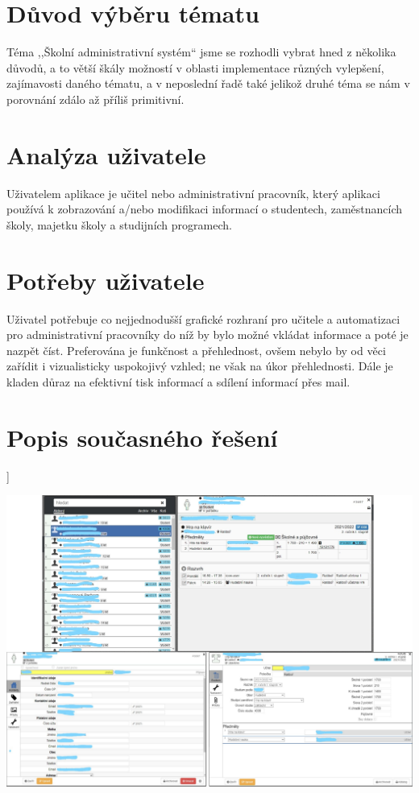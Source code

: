 \documentclass[a4paper, 11pt, twocolumn]{article}
\begin{document}
	
	\section*{\large{Důvod výběru tématu}}
	\vspace*{-0.2cm}
	Téma ,,Školní administrativní systém`` jsme se rozhodli vybrat hned z několika důvodů, a to větší škály možností v oblasti implementace různých 
	vylepšení, zajímavosti daného tématu, a v neposlední řadě také jelikož druhé téma se nám v porovnání zdálo až příliš primitivní.

	\section*{\large{Analýza uživatele}}
	\vspace*{-0.2cm}
	Uživatelem aplikace je učitel nebo administrativní pracovník, který aplikaci používá k zobrazování a/nebo modifikaci informací o studentech, 
	zaměstnancích školy, majetku školy a studijních programech. 

	\section*{\large{Potřeby uživatele}}
	\vspace*{-0.2cm}
	Uživatel potřebuje co nejjednodušší grafické rozhraní pro učitele a automatizaci pro administrativní pracovníky do níž by bylo možné vkládat informace a 
	poté je nazpět číst. Preferována je funkčnost a přehlednost, ovšem nebylo by od věci zařídit i vizualisticky uspokojivý vzhled; ne však na úkor 
	přehlednosti. Dále je kladen důraz na efektivní tisk informací a sdílení informací přes mail.

	\section*{\large{Popis současného řešení}}
	\vspace*{-0.2cm}]
	\begin{center}
	\includegraphics[width=1\textwidth]{puvodni.png}
	\end{center}
\end{document}
